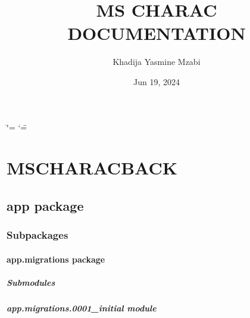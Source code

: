 \documentclass[letterpaper,10pt,english]{sphinxmanual}
\title{MS CHARAC DOCUMENTATION}
\date{Jun 19, 2024}
\author{Khadija Yasmine Mzabi}
\begin{document}
\ifdefined\shorthandoff
  \ifnum\catcode`\=\string=\active\shorthandoff{=}\fi
  \ifnum\catcode`\"=\active{}\fi
\fi

\pagestyle{empty}
\sphinxmaketitle
\pagestyle{plain}
\sphinxtableofcontents
\pagestyle{normal}
\label{\detokenize{index::doc}}


\sphinxstepscope


\chapter{MS\sphinxhyphen{}CHARAC\sphinxhyphen{}BACK}
\label{\detokenize{modules:ms-charac-back}}\label{\detokenize{modules::doc}}
\sphinxstepscope


\section{app package}
\label{\detokenize{app:app-package}}\label{\detokenize{app::doc}}

\subsection{Subpackages}
\label{\detokenize{app:subpackages}}
\sphinxstepscope


\subsubsection{app.migrations package}
\label{\detokenize{app.migrations:app-migrations-package}}\label{\detokenize{app.migrations::doc}}

\paragraph{Submodules}
\label{\detokenize{app.migrations:submodules}}

\paragraph{app.migrations.0001\_initial module}
\label{\detokenize{app.migrations:module-app.migrations.0001_initial}}\label{\detokenize{app.migrations:app-migrations-0001-initial-module}}
\end{document}
